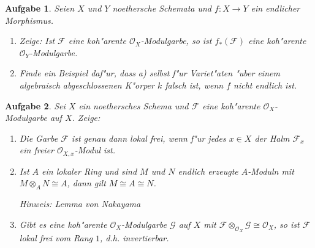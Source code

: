 \documentclass[paper = A4, fontsize=12pt, numbers=noendperiod, chapterprefix=true]{scrbook}
\theoremstyle{break}
\newtheorem{Aufg}{Aufgabe}
\theoremstyle{nonumberbreak}
\theoremstyle{nonumberplain}
\newcommand{\calO}{\mathcal{O}}
\newcommand{\F}{\mathcal{F}} %
\newcommand{\G}{\mathcal{G}} %
\begin{document}
\begin{Aufg}
Seien $X$ und $Y$ noethersche Schemata und $f\colon X \to Y$ ein endlicher Morphismus. 
\begin{enumerate}%
 \item Zeige: Ist $\mathcal{F}$ eine koh"arente $\mathcal{O}_X$-Modulgarbe, so ist $f_*(\mathcal{F})$ eine koh"arente $\mathcal{O}_Y$-Modulgarbe.
 \item Finde ein Beispiel daf"ur, dass a) selbst f"ur Variet"aten "uber einem algebraisch abgeschlossenen K"orper $k$ falsch ist, wenn $f$ nicht endlich ist.
\end{enumerate}
\end{Aufg}


\begin{Aufg}
Sei $X$ ein noethersches Schema und $\F$ eine koh"arente $\mathcal{O}_X$-Modulgarbe auf $X$. Zeige:
\begin{enumerate}%
 \item Die Garbe $\F$ ist genau dann lokal frei, wenn f"ur jedes $x \in X$ der Halm $\F_x$ %
 ein freier $\calO_{X,x}$-Modul ist.
 \item Ist $A$ ein lokaler Ring und sind $M$ und $N$ endlich erzeugte $A$-Moduln mit $M \otimes_A N \cong A$, dann gilt $M \cong A \cong N$. 
 
 \textit{Hinweis: Lemma von Nakayama}
 \item Gibt es eine koh"arente $\mathcal{O}_X$-Modulgarbe $\G$ auf $X$ mit $\F \otimes_{\calO_X} \G \cong \calO_X$, so ist $\F$ lokal frei vom Rang $1$, d.h. invertierbar.
\end{enumerate}
\end{Aufg}
\end{document}
